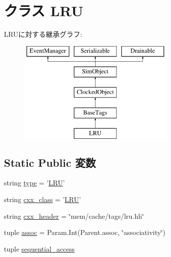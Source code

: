 \hypertarget{classTags_1_1LRU}{
\section{クラス LRU}
\label{classTags_1_1LRU}
}
LRUに対する継承グラフ:\begin{figure}[H]
\begin{center}
\leavevmode
\includegraphics[height=5cm]{classTags_1_1LRU}
\end{center}
\end{figure}
\subsection*{Static Public 変数}
\begin{DoxyCompactItemize}
\item 
string \hyperlink{classTags_1_1LRU_acce15679d830831b0bbe8ebc2a60b2ca}{type} = '\hyperlink{classTags_1_1LRU}{LRU}'
\item 
string \hyperlink{classTags_1_1LRU_a58cd55cd4023648e138237cfc0822ae3}{cxx\_\-class} = '\hyperlink{classTags_1_1LRU}{LRU}'
\item 
string \hyperlink{classTags_1_1LRU_a17da7064bc5c518791f0c891eff05fda}{cxx\_\-header} = \char`\"{}mem/cache/tags/lru.hh\char`\"{}
\item 
tuple \hyperlink{classTags_1_1LRU_a19c16ab1fbe2e2d958dbfd7213149cfc}{assoc} = Param.Int(Parent.assoc, \char`\"{}associativity\char`\"{})
\item 
tuple \hyperlink{classTags_1_1LRU_a0545f3dc4d67873176d4d70d4618e078}{sequential\_\-access}
\end{DoxyCompactItemize}


